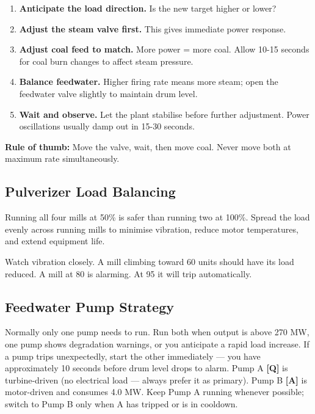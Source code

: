 \documentclass[10pt,a5paper]{article}
\newcommand{\key}[1]{\textbf{[#1]}}
\begin{document}
\begin{enumerate}
  \item \textbf{Anticipate the load direction.} Is the new target higher or lower?
  \item \textbf{Adjust the steam valve first.} This gives immediate power response.
  \item \textbf{Adjust coal feed to match.} More power = more coal. Allow 10-15 seconds
        for coal burn changes to affect steam pressure.
  \item \textbf{Balance feedwater.} Higher firing rate means more steam; open the
        feedwater valve slightly to maintain drum level.
  \item \textbf{Wait and observe.} Let the plant stabilise before further adjustment.
        Power oscillations usually damp out in 15-30 seconds.
\end{enumerate}

\textbf{Rule of thumb:} Move the valve, wait, then move coal. Never move both
at maximum rate simultaneously.

\subsection{Pulverizer Load Balancing}

Running all four mills at 50\% is safer than running two at 100\%. Spread the
load evenly across running mills to minimise vibration, reduce motor
temperatures, and extend equipment life.


Watch vibration closely. A mill climbing toward 60 units should have its load
reduced. A mill at 80 is alarming. At 95 it will trip automatically.

\subsection{Feedwater Pump Strategy}

Normally only one pump needs to run. Run both when output is above 270 MW,
one pump shows degradation warnings, or you anticipate a rapid load increase.
If a pump trips unexpectedly, start the other immediately --- you have
approximately 10 seconds before drum level drops to alarm. Pump A \key{Q}
is turbine-driven (no electrical load --- always prefer it as primary). Pump B
\key{A} is motor-driven and consumes 4.0 MW. Keep Pump A running whenever possible;
switch to Pump B only when A has tripped or is in cooldown.
\end{document}
